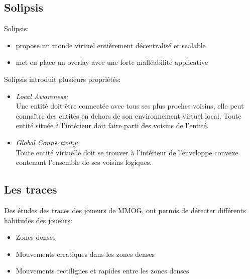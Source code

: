 \documentclass{beamer}
\begin{document}
  \subsection{Solipsis}

  \begin{frame}
	Solipsis:\\
	\begin{itemize}
		\item propose un monde virtuel entièrement décentralisé et scalable\\
		\item met en place un overlay avec une forte malléabilité applicative\\
	\end{itemize}
  \end{frame}

  \begin{frame}
	Solipsis introduit plusieurs propriétés:
	\begin{itemize}
                \item \textit{Local Awareness:}\\
                Une entité doit être connectée avec tous ses plus proches voisins, elle peut connaître des entités en dehors de son environnement virtuel local. Toute entité située à l'intérieur doit faire parti des voisins de l'entité.
                \item \textit{Global Connectivity:}\\
                Toute entité virtuelle doit se trouver à l'intérieur de l'enveloppe convexe contenant l'ensemble de ses voisins logiques. \\
	\end{itemize}
  \end{frame}

  \subsection{Les traces}
  \begin{frame}
	Des études des traces des joueurs de MMOG, ont permis de détecter différents habitudes des joueurs:
	\begin{itemize}
		\item Zones denses 
		\item Mouvements erratiques dans les zones denses
		\item Mouvements rectilignes et rapides entre les zones denses
	\end{itemize}
  \end{frame}
\end{document}
